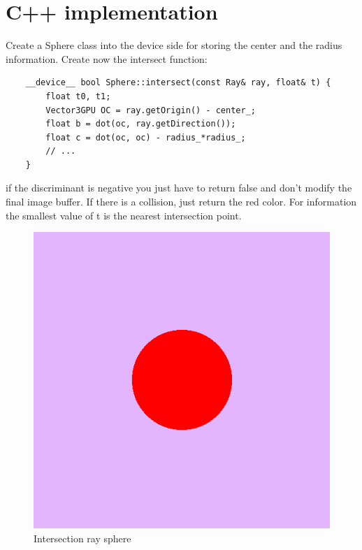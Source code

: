 \documentclass{article}
\begin{document}
\section{C++ implementation}
Create a Sphere class into the device side for storing the center and the radius information. Create now the intersect function: 
\begin{lstlisting}
	__device__ bool Sphere::intersect(const Ray& ray, float& t) {
		float t0, t1;
		Vector3GPU OC = ray.getOrigin() - center_;
		float b = dot(oc, ray.getDirection());
		float c = dot(oc, oc) - radius_*radius_;
		// ...
	}
\end{lstlisting}
if the discriminant is negative you just have to return false and don't modify the final image buffer. If there is a collision, just return the red color. For information the smallest value of t is the nearest intersection point.
\begin{figure}[h]
	\centering
	\includegraphics[scale=0.6]{figures/intersect.png}
	\caption{Intersection ray sphere}
\end{figure}

\newpage
\end{document}
